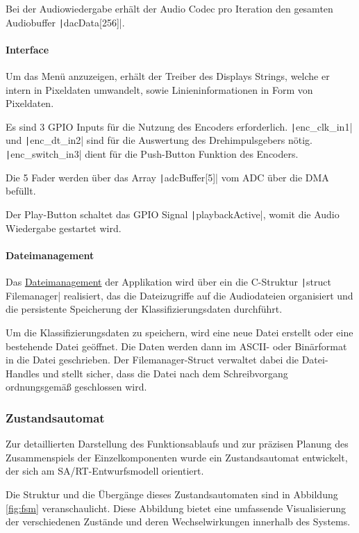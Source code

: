 Bei der Audiowiedergabe erhält der Audio Codec pro Iteration den gesamten Audiobuffer \texttt|dacData[256]|.

\paragraph{Interface}

Um das Menü anzuzeigen, erhält der Treiber des Displays Strings, welche er intern in Pixeldaten umwandelt, sowie Linieninformationen in Form von Pixeldaten. 

Es sind 3 GPIO Inputs für die Nutzung des Encoders erforderlich. \texttt|enc_clk_in1| und \texttt|enc_dt_in2| sind für die Auswertung des Drehimpulsgebers nötig. \texttt|enc_switch_in3| dient für die Push-Button Funktion des Encoders.

Die 5 Fader werden über das Array \texttt|adcBuffer[5]| vom ADC über die DMA befüllt.

Der Play-Button schaltet das GPIO Signal \texttt|playbackActive|, womit die Audio Wiedergabe gestartet wird.

\paragraph{Dateimanagement}

Das \hyperlink{Dateisystem}{Dateimanagement} der Applikation wird über ein die C-Struktur \texttt|struct Filemanager| realisiert, das die Dateizugriffe auf die Audiodateien organisiert und die persistente Speicherung der Klassifizierungsdaten durchführt.  

Um die Klassifizierungsdaten zu speichern, wird eine neue Datei erstellt oder eine bestehende Datei geöffnet. Die Daten werden dann im ASCII- oder Binärformat in die Datei geschrieben. Der Filemanager-Struct verwaltet dabei die Datei-Handles und stellt sicher, dass die Datei nach dem Schreibvorgang ordnungsgemäß geschlossen wird.

\subsubsection{Zustandsautomat}

Zur detaillierten Darstellung des Funktionsablaufs und zur präzisen Planung des Zusammenspiels der Einzelkomponenten wurde ein Zustandsautomat entwickelt, der sich am SA/RT-Entwurfsmodell orientiert. 

Die Struktur und die Übergänge dieses Zustandsautomaten sind in Abbildung \ref{fig:fsm} veranschaulicht. Diese Abbildung bietet eine umfassende Visualisierung der verschiedenen Zustände und deren Wechselwirkungen innerhalb des Systems.

